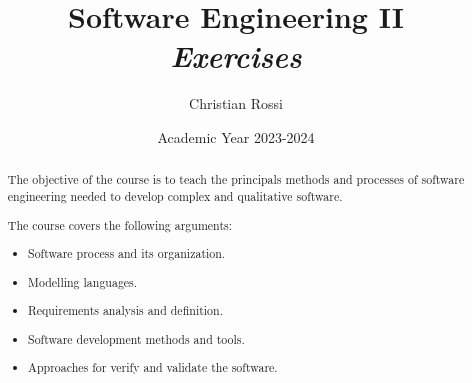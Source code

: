 \documentclass[12pt, a4paper]{report}
\title{Software Engineering II\\ \textit{Exercises}}
\author{Christian Rossi}
\date{Academic Year 2023-2024}
\newtheorem[style=M,bodystyle=\normalfont]{theorem}{Theorem}
\newtheorem[style=M,bodystyle=\normalfont]{corollary}{Corollary}
\newtheorem[style=M,bodystyle=\normalfont]{lemma}{Lemma}
\newtheorem[style=M,bodystyle=\normalfont]{definition}{Definition}
\begin{document}
\maketitle

\newpage

\begin{abstract}
    The objective of the course is to teach the principals methods and processes of software engineering needed to develop complex and qualitative software.
    \par
    The course covers the following arguments:
    \begin{itemize}
        \item Software process and its organization.
        \item Modelling languages.
        \item Requirements analysis and definition.
        \item Software development methods and tools.
        \item Approaches for verify and validate the software.
    \end{itemize}
\end{abstract}

\newpage

\tableofcontents

\newpage


    
\end{document}
